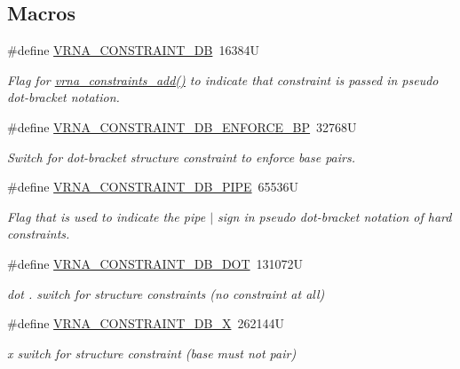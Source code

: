 \subsection*{Macros}
\begin{DoxyCompactItemize}
\item 
\#define \hyperlink{group__hard__constraints_ga4bfc2f15c4f261c62a11af9d2aa80c90}{V\+R\+N\+A\+\_\+\+C\+O\+N\+S\+T\+R\+A\+I\+N\+T\+\_\+\+DB}~16384U
\begin{DoxyCompactList}\small\item\em Flag for \hyperlink{group__constraints_ga35a401f680969a556858a8dd5f1d07cc}{vrna\+\_\+constraints\+\_\+add()} to indicate that constraint is passed in pseudo dot-\/bracket notation. \end{DoxyCompactList}\item 
\#define \hyperlink{group__hard__constraints_ga29ebe940110d60ab798fdacbcdbbfb7d}{V\+R\+N\+A\+\_\+\+C\+O\+N\+S\+T\+R\+A\+I\+N\+T\+\_\+\+D\+B\+\_\+\+E\+N\+F\+O\+R\+C\+E\+\_\+\+BP}~32768U
\begin{DoxyCompactList}\small\item\em Switch for dot-\/bracket structure constraint to enforce base pairs. \end{DoxyCompactList}\item 
\#define \hyperlink{group__hard__constraints_ga13053547a2de5532b64b64d35e097ae1}{V\+R\+N\+A\+\_\+\+C\+O\+N\+S\+T\+R\+A\+I\+N\+T\+\_\+\+D\+B\+\_\+\+P\+I\+PE}~65536U
\begin{DoxyCompactList}\small\item\em Flag that is used to indicate the pipe \textquotesingle{}$\vert$\textquotesingle{} sign in pseudo dot-\/bracket notation of hard constraints. \end{DoxyCompactList}\item 
\#define \hyperlink{group__hard__constraints_ga369bea82eae75fbe626f409fa425747e}{V\+R\+N\+A\+\_\+\+C\+O\+N\+S\+T\+R\+A\+I\+N\+T\+\_\+\+D\+B\+\_\+\+D\+OT}~131072U
\begin{DoxyCompactList}\small\item\em dot \textquotesingle{}.\textquotesingle{} switch for structure constraints (no constraint at all) \end{DoxyCompactList}\item 
\#define \hyperlink{group__hard__constraints_ga7283bbe0f8954f7b030ecc3f2d1932b2}{V\+R\+N\+A\+\_\+\+C\+O\+N\+S\+T\+R\+A\+I\+N\+T\+\_\+\+D\+B\+\_\+X}~262144U
\begin{DoxyCompactList}\small\item\em \textquotesingle{}x\textquotesingle{} switch for structure constraint (base must not pair) \end{DoxyCompactList}\item 

\end{DoxyCompactItemize}
